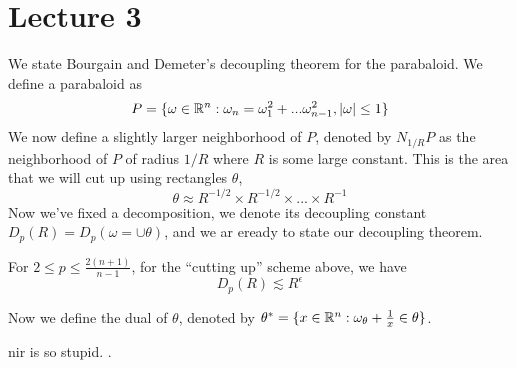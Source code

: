 \section*{Lecture 3}
We state Bourgain and Demeter's decoupling theorem for the parabaloid. We define a parabaloid as
\begin{equation*}
    P=\{\omega\in\mathbb{R}^n: \omega_n=\omega_1^2+...\omega_{n-1}^2, |\omega|\leq 1\}
\end{equation*}
We now define a slightly larger neighborhood of $P$, denoted by $N_{1/R}P$ as the neighborhood of $P$ of radius $1/R$ where $R$ is some large constant. This is the area that we will cut up using rectangles $\theta$,
\begin{equation*}
    \theta\approx R^{-1/2}\times R^{-1/2}\times...\times R^{-1}
\end{equation*}
Now we've fixed a decomposition, we denote its decoupling constant $D_p(R)=D_p(\omega=\cup\theta)$, and we ar eready to state our decoupling theorem.

\begin{theorem}
    For $2\leq p\leq\frac{2(n+1)}{n-1}$, for the ``cutting up'' scheme above, we have
    \begin{equation*}
        D_p(R)\lesssim R^{\epsilon}
    \end{equation*}
\end{theorem}

Now we define the dual of $\theta$, denoted by $\theta^*=\{x\in\mathbb{R}^n: \omega_\theta+\frac{1}{x}\in\theta\}$.  

nir is so stupid.
.